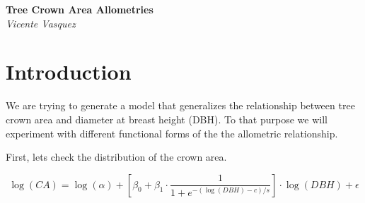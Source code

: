 \documentclass{article}
\begin{document}
\begin{titlepage}
   \begin{center}
      \Large\textbf{Tree Crown Area Allometries}\\
      \large\textit{Vicente Vasquez}
   \end{center}
\end{titlepage}

\section{Introduction}

We are trying to generate a model that generalizes the relationship between tree crown area and diameter at breast height (DBH). To that purpose we will experiment with different functional forms of the the allometric relationship.

First, lets check the distribution of the crown area. 

\begin{equation}
    \log(CA) = \log(\alpha) + \left[\beta_0 + \beta_1 \cdot \frac{1}{1 + e^{-(\log(DBH)-c)/s}}\right] \cdot \log(DBH) + \epsilon
\end{equation}
\end{document}
